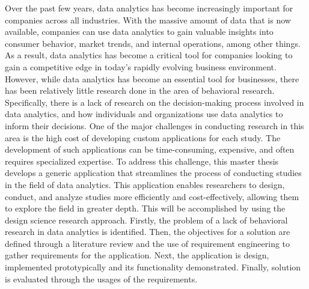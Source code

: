 Over the past few years, data analytics has become increasingly important for companies across all industries. With the massive amount of data that is now available, companies can use data analytics to gain valuable insights into consumer behavior, market trends, and internal operations, among other things. As a result, data analytics has become a critical tool for companies looking to gain a competitive edge in today's rapidly evolving business environment. However, while data analytics has become an essential tool for businesses, there has been relatively little research done in the area of behavioral research. Specifically, there is a lack of research on the decision-making process involved in data analytics, and how individuals and organizations use data analytics to inform their decisions. One of the major challenges in conducting research in this area is the high cost of developing custom applications for each study. The development of such applications can be time-consuming, expensive, and often requires specialized expertise. To address this challenge, this master thesis develops a generic application that streamlines the process of conducting studies in the field of data analytics. This application enables researchers to design, conduct, and analyze studies more efficiently and cost-effectively, allowing them to explore the field in greater depth. This will be accomplished by using the design science research approach. Firstly, the problem of a lack of behavioral research in data analytics is identified. Then, the objectives for a solution are defined through a literature review and the use of requirement engineering to gather requirements for the application. Next, the application is design, implemented prototypically and its functionality demonstrated. Finally, solution is evaluated through the usages of the requirements.

\newpage